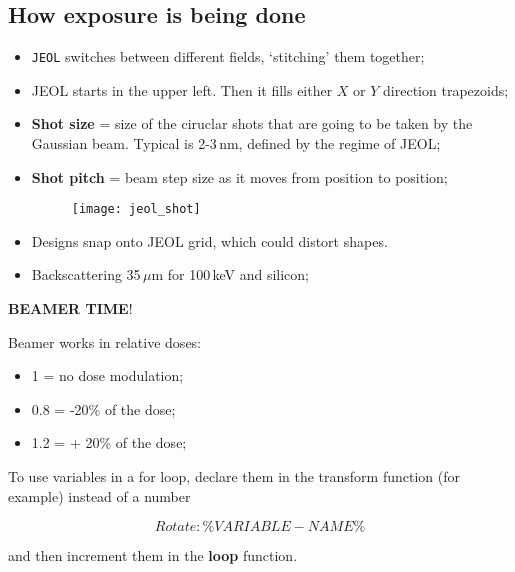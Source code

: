 \subsection{How exposure is being done}
\begin{itemize}
\item \verb|JEOL| switches between different fields, `stitching' them
  together;
\item JEOL starts in  the upper left.  Then it fills either  $ X $ or
  $ Y $ direction trapezoids;
\item \textbf{Shot size} = size of  the ciruclar shots that are going
  to be taken  by the Gaussian beam.  Typical is  2-3\,nm, defined by
  the regime of JEOL;
\item \textbf{Shot pitch} = beam step  size as it moves from position
  to position;

\begin{figure}[h]
  \centering \texttt{[image: jeol\_shot]}
\end{figure}

\noindent
\item Designs snap onto JEOL grid, which could distort shapes.
\item Backscattering 35\,$ \mu $m for 100\,keV and silicon;
\end{itemize}
\newpage
\begin{center}
  {\Huge \textbf{BEAMER TIME}!}
\end{center}
\begin{framed}\noindent
  Beamer works in relative doses:
  \begin{itemize}
  \item 1 = no dose modulation;
  \item 0.8 = -20\% of the dose;
  \item 1.2 = + 20\% of the dose;
  \end{itemize}


  To  use variables  in a  for loop,  declare them  in the  transform
  function (for example) instead of a number

  \begin{equation}
    \label{eq:variable}
    Rotate:    \%VARIABLE-NAME\%
  \end{equation}

  \noindent and then increment them in the \textbf{loop} function.
\end{framed}

